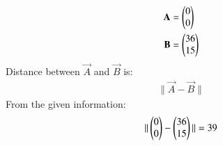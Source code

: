 
\begin{align}
\mathbf{A} &=\begin{pmatrix}0\\0\end{pmatrix} \label{eq:constr_a_pts_and_vectors}\\
\mathbf{B} &=\begin{pmatrix}36\\15\end{pmatrix} \label{eq:constr_b_pts_and_vectors}
\end{align}
Distance between $\vec{A}$ and $\vec{B}$ is:
\begin{align}
\| \vec{A} - \vec{B} \| 
\end{align}
From the given information:
\begin{align}
\| \begin{pmatrix}0\\0\end{pmatrix} - \begin{pmatrix}36\\15\end{pmatrix} \| = 39
\end{align}






